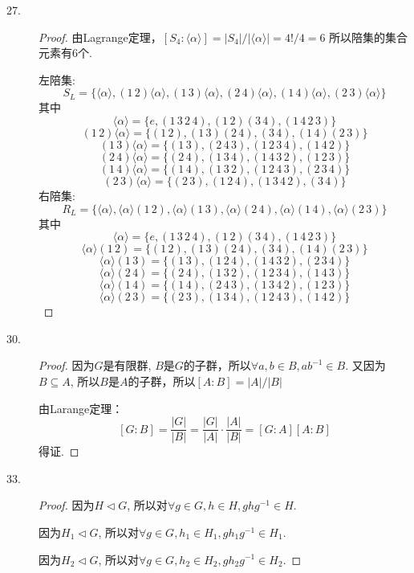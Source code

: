 \documentclass[UTF8, onecolumn, a4paper]{article}
\begin{document}
\begin{description}
\item[27.]
\begin{proof}
	由Lagrange定理，$[S_4:\langle\alpha\rangle] = |S_4| / |\langle\alpha\rangle| = 4!/4 = 6$
	所以陪集的集合元素有6个.
	
	左陪集:
	$$S_L = \{\langle\alpha\rangle, (1\,2)\langle\alpha\rangle, (1\,3)\langle\alpha\rangle, (2\,4)\langle\alpha\rangle, (1\,4)\langle\alpha\rangle, (2\,3)\langle\alpha\rangle\}$$
	其中
	$$\langle\alpha\rangle = \{e, (1\,3\,2\,4), (1\,2)(3\,4), (1\,4\,2\,3)\}$$
	$$(1\,2)\langle\alpha\rangle = \{(1\,2), (1\,3)(2\,4), (3\,4), (1\,4)(2\,3)\}$$
	$$(1\,3)\langle\alpha\rangle = \{(1\,3), (2\,4\,3), (1\,2\,3\,4), (1\,4\,2)\}$$
	$$(2\,4)\langle\alpha\rangle = \{(2\,4), (1\,3\,4), (1\,4\,3\,2), (1\,2\,3)\}$$
	$$(1\,4)\langle\alpha\rangle = \{(1\,4), (1\,3\,2), (1\,2\,4\,3), (2\,3\,4)\}$$
	$$(2\,3)\langle\alpha\rangle = \{(2\,3), (1\,2\,4), (1\,3\,4\,2), (3\,4)\}$$
	右陪集:
	$$R_L = \{\langle\alpha\rangle, \langle\alpha\rangle(1\,2), \langle\alpha\rangle(1\,3), \langle\alpha\rangle(2\,4), \langle\alpha\rangle(1\,4), \langle\alpha\rangle(2\,3)\}$$
	其中
	$$\langle\alpha\rangle = \{e, (1\,3\,2\,4), (1\,2)(3\,4), (1\,4\,2\,3)\}$$
	$$\langle\alpha\rangle(1\,2) = \{(1\,2), (1\,3)(2\,4), (3\,4), (1\,4)(2\,3)\}$$
	$$\langle\alpha\rangle(1\,3) = \{(1\,3), (1\,2\,4), (1\,4\,3\,2), (2\,3\,4)\}$$
	$$\langle\alpha\rangle(2\,4) = \{(2\,4), (1\,3\,2), (1\,2\,3\,4), (1\,4\,3)\}$$
	$$\langle\alpha\rangle(1\,4) = \{(1\,4), (2\,4\,3), (1\,3\,4\,2), (1\,2\,3)\}$$
	$$\langle\alpha\rangle(2\,3) = \{(2\,3), (1\,3\,4), (1\,2\,4\,3), (1\,4\,2)\}$$
\end{proof}

\item[30.]
\begin{proof}
	因为$G$是有限群, $B$是$G$的子群，所以$\forall a, b\in B, ab^{-1}\in B$. 又因为$B\subseteq A$, 所以$B$是$A$的子群，所以$[A:B] = |A| / |B|$
	
	由Larange定理：
	$$[G:B] = \frac{|G|}{|B|} = \frac{|G|}{|A|}\cdot\frac{|A|}{|B|} = [G:A][A:B]$$
	得证.
\end{proof}

\item[33.]
\begin{proof}
	因为$H\triangleleft G$, 所以对$\forall g\in G, h\in H, ghg^{-1}\in H$.
	
	因为$H_1\triangleleft G$, 所以对$\forall g\in G, h_1\in H_1, gh_1g^{-1}\in H_1$.
	
	因为$H_2\triangleleft G$, 所以对$\forall g\in G, h_2\in H_2, gh_2g^{-1}\in H_2$.
	

\end{proof}
\end{description}
\end{document}
